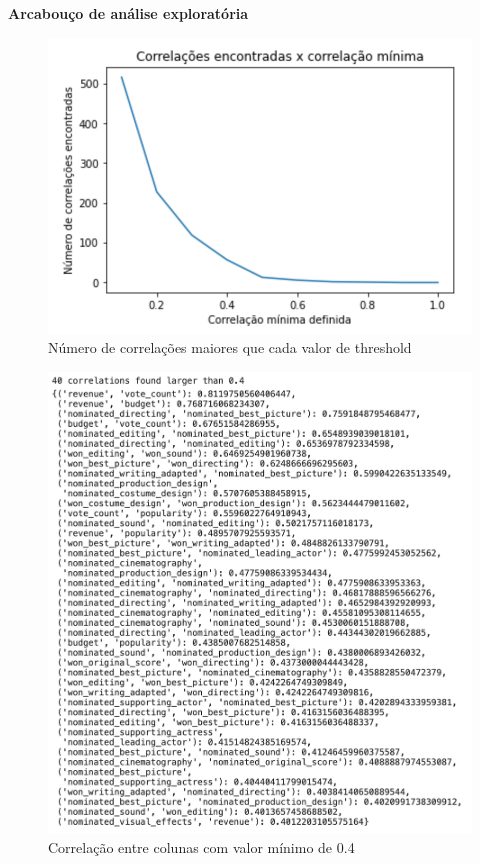         \textbf{Arcabouço de análise exploratória}\par

        \begin{figure}[htb]
        	\caption{\label{corrs_graph}Número de correlações maiores que cada valor de threshold}
        	\begin{center}
        		\includegraphics[scale=0.8]{corrs_graph.png}
        	\end{center}
        \end{figure}

        \begin{figure}[htb]
        	\caption{\label{corrs0.4}Correlação entre colunas com valor mínimo de 0.4}
        	\begin{center}
        		\includegraphics[scale=0.7]{corrs0.4.png}
        	\end{center}
        \end{figure}

